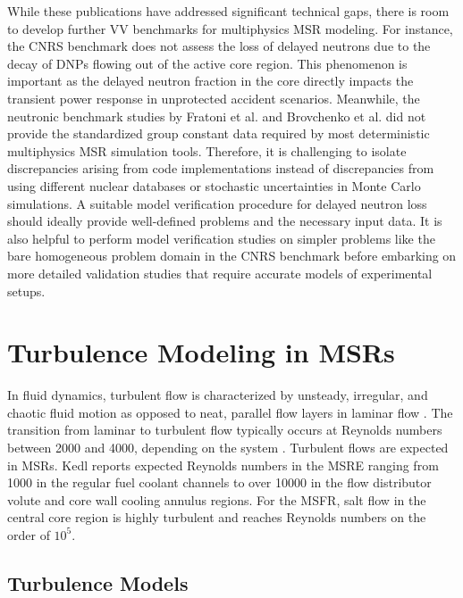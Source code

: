 While these publications have addressed significant technical gaps, there is room to develop
further \gls{VV} benchmarks for multiphysics \gls{MSR} modeling. For instance, the
CNRS benchmark does not assess the loss of delayed neutrons due to the decay of \glspl{DNP} flowing
out of the active core region. This phenomenon is important as the delayed neutron fraction in the
core directly impacts the transient power response in unprotected accident scenarios. Meanwhile,
the neutronic benchmark studies by Fratoni et al. \cite{fratoni_molten_2020} and Brovchenko et al.
\cite{brovchenko_neutronic_2019} did not provide the standardized group constant data required by
most deterministic multiphysics \gls{MSR} simulation tools. Therefore, it is challenging to isolate
discrepancies arising from code implementations instead of discrepancies from using different
nuclear databases or stochastic uncertainties in Monte Carlo simulations. A suitable model
verification procedure for delayed neutron loss should ideally provide well-defined problems and
the necessary input data. It is also helpful to perform model verification studies on simpler
problems like the bare homogeneous problem domain in the CNRS benchmark before embarking on more
detailed validation studies that require accurate models of experimental setups.

\section{Turbulence Modeling in MSRs}

In fluid dynamics, turbulent flow is characterized by unsteady, irregular, and
chaotic fluid motion as opposed to neat, parallel flow layers in laminar flow
\cite{pope_turbulent_2000}. The transition from laminar to turbulent flow
typically occurs at Reynolds numbers between 2000 and 4000, depending on the
system \cite{pope_turbulent_2000}. Turbulent flows are expected in \glspl{MSR}.
Kedl \cite{kedl_fluid_1970} reports expected Reynolds numbers in the \gls{MSRE}
ranging from 1000 in the regular fuel coolant channels to over 10000 in the
flow distributor volute and core wall cooling annulus regions. For the
\gls{MSFR}, salt flow in the central core region is highly turbulent and
reaches Reynolds numbers on the order of $10^5$.

\subsection{Turbulence Models}

